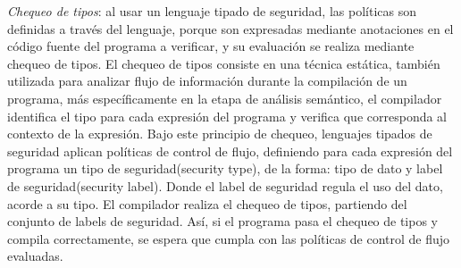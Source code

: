\emph{Chequeo de tipos}: al usar un lenguaje tipado de seguridad, las políticas
son definidas a través del lenguaje, porque son expresadas mediante anotaciones
en el código fuente del programa a verificar, y su evaluación se realiza
mediante chequeo de tipos.\newline 
El chequeo de tipos consiste en una técnica estática,
también utilizada para analizar flujo de información durante la compilación de
un programa, más específicamente en la etapa de análisis semántico, el
compilador identifica el tipo para cada expresión del programa y verifica que
corresponda al contexto de la expresión.\newline
Bajo este principio de chequeo, lenguajes tipados de seguridad aplican
políticas de control de flujo, definiendo para cada expresión del programa un
tipo de seguridad(security type), de la forma:  tipo de dato y label de
seguridad(security label). Donde el label de seguridad regula el uso del dato,
acorde a su tipo.\newline 
El compilador realiza el chequeo de tipos, partiendo del conjunto de labels de
seguridad. Así, si el programa pasa el chequeo de tipos y compila correctamente,
se espera que cumpla con las políticas de control de flujo evaluadas.